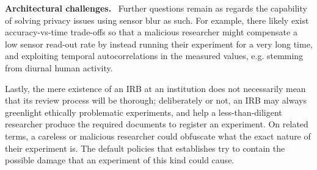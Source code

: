 \textbf{Architectural challenges.}~
Further questions remain as regards the capability of solving privacy 
issues using sensor blur as such. For example, there likely exist 
accuracy-vs-time trade-offs so that a malicious researcher might compensate 
a low sensor read-out rate by instead running their experiment for a 
very long time, and exploiting temporal autocorrelations in the measured 
values, e.g. stemming from diurnal human activity.

Lastly, the mere existence of an IRB at an institution 
does not necessarily mean that its review process will be thorough; 
deliberately or not, an IRB may always greenlight ethically problematic 
experiments, and help a less-than-diligent researcher produce the 
required documents to register an experiment. On related terms, 
a careless or malicious researcher could obfuscate 
what the exact nature of their experiment is. The default policies 
that \sysname establishes try to contain the possible  
damage that an experiment of this kind could cause.

